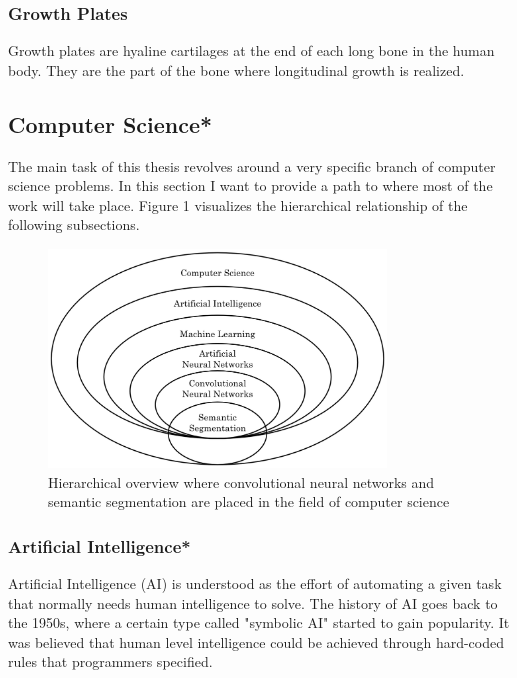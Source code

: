 \subsubsection{Growth Plates}

Growth plates are hyaline cartilages at the end of each long bone in the human body. They are the part of the bone where longitudinal growth is realized.

\subsection{Computer Science*}

The main task of this thesis revolves around a very specific branch of computer science problems. In this section I want to provide a path to where most of the work will take place. Figure 1 visualizes the hierarchical relationship of the following subsections.

\begin{figure}[H]
\centering
\par
\includegraphics[width=0.8\textwidth]{imgs/cs_hier.png}
\caption{Hierarchical overview where convolutional neural networks and semantic segmentation are placed in the field of computer science}
\par
\end{figure}

\subsubsection{Artificial Intelligence*}

Artificial Intelligence (AI) is understood as the effort of automating a given task that normally needs human intelligence to solve\cite{Chollet2017}. The history of AI goes back to the 1950s, where a certain type called "symbolic AI" started to gain popularity. It was believed that human level intelligence could be achieved through hard-coded rules that programmers specified. 

